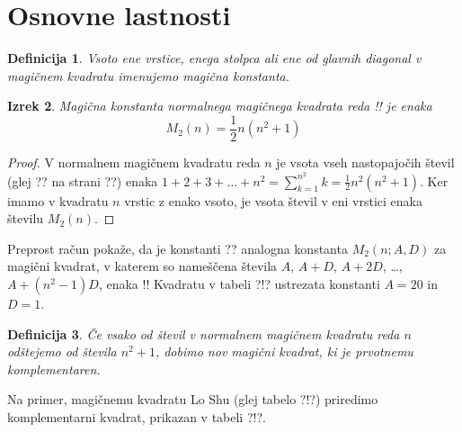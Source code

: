 \documentclass[a4paper,12pt]{article}
\newtheorem{izrek}{Izrek}[section]
\newtheorem{definicija}[izrek]{Definicija}
\begin{document}

\section{Osnovne lastnosti}

\begin{definicija}
      Vsoto ene vrstice, enega stolpca ali ene od glavnih diagonal
      v magičnem kvadratu imenujemo \emph{magična konstanta}.
\end{definicija}


\begin{izrek}
      Magična konstanta normalnega magičnega kvadrata reda !!
      je enaka
      \begin{equation}
         M_2(n) = \frac{1}{2} n(n^2+1)
      \end{equation}
\end{izrek}


\begin{proof}
      V normalnem magičnem kvadratu reda $n$ je vsota vseh nastopajočih
      števil (glej ?? na strani ??) enaka
      $1+2+3+\dots+n^2=\sum_{k=1}^{n^2}k=\frac{1}{2}n^2(n^2+1)$. Ker imamo
      v kvadratu $n$ vrstic z enako vsoto, je vsota števil v eni vrstici
      enaka številu $M_2(n)$. %
   
\end{proof}%

Preprost račun pokaže, da je konstanti ?? analogna konstanta
$M_2(n;A,D)$ za magični kvadrat, v katerem so nameščena števila
$A$, $A+D$, $A+2D$, \dots, $A+(n^2-1)D$, enaka %
!!
Kvadratu v tabeli ?!? ustrezata konstanti $A=20$ in $D=1$.

\begin{definicija}
      Če vsako od števil v normalnem magičnem kvadratu reda $n$ odštejemo
      od števila $n^2+1$, dobimo nov magični kvadrat, ki je prvotnemu
      \emph{komplementaren}.
\end{definicija}

Na primer, magičnemu kvadratu Lo Shu (glej tabelo ?!?) priredimo
komplementarni kvadrat, prikazan v tabeli ?!?.
%
\end{document}
